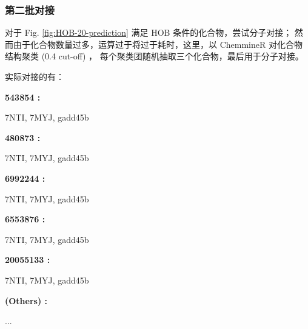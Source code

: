 \documentclass[
]{article}
\begin{document}
\hypertarget{dock2}{%
\subsubsection{第二批对接}\label{dock2}}

对于 Fig. \ref{fig:HOB-20-prediction} 满足 HOB 条件的化合物，尝试分子对接；
然而由于化合物数量过多，运算过于将过于耗时，这里，以 ChemmineR 对化合物结构聚类 (0.4 cut-off) ，
每个聚类团随机抽取三个化合物，最后用于分子对接。

实际对接的有：

\begin{center}\begin{tcolorbox}[colback=gray!10, colframe=gray!50, width=0.9\linewidth, arc=1mm, boxrule=0.5pt]
\textbf{
543854
:}

\vspace{0.5em}

    7NTI, 7MYJ, gadd45b

\vspace{2em}


\textbf{
480873
:}

\vspace{0.5em}

    7NTI, 7MYJ, gadd45b

\vspace{2em}


\textbf{
6992244
:}

\vspace{0.5em}

    7NTI, 7MYJ, gadd45b

\vspace{2em}


\textbf{
6553876
:}

\vspace{0.5em}

    7NTI, 7MYJ, gadd45b

\vspace{2em}


\textbf{
20055133
:}

\vspace{0.5em}

    7NTI, 7MYJ, gadd45b

\vspace{2em}


\textbf{
(Others)
:}

\vspace{0.5em}

    ...

\vspace{2em}
\end{tcolorbox}
\end{center}
\end{document}
